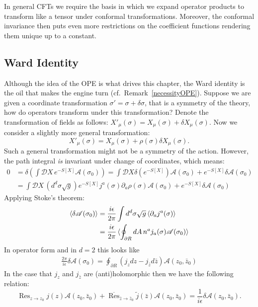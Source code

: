 \documentclass{report}
\theoremstyle{plain}
\theoremstyle{definition}
\theoremstyle{remark}
\newcommand{\FR}[2]{\frac{#1}{#2}}
\newcommand{\mc}{\mathcal}
\newcommand{\ms}{\mathscr}
\newcommand{\sg}{\sigma}
\newcommand{\di}{\partial}
\DeclareMathOperator{\Res}{Res}
\begin{document}
In general CFTs we require the basis in which we expand operator products
to transform like a tensor under conformal transformations. Moreover, the
conformal invariance then puts even more restrictions on the coefficient
functions rendering them unique up to a constant.

\subsection{Ward Identity}
Although the idea of the OPE is what drives this chapter, the Ward identity
is the oil that makes the engine turn (cf.~Remark~\ref{necessityOPE}). Suppose we
are given a coordinate transformation $\sg' = \sg+\delta\sg$, that is a
symmetry of the theory, how do operators transform under this
transformation? Denote the transformation of fields as follows:
$X'_\mu(\sg) = X_\mu(\sg) + \delta X_\mu(\sg)$. Now we consider a slightly
more general transformation:
\[ X'_\mu(\sg) = X_\mu(\sg)+\rho(\sg)\delta X_\mu(\sg).\]
Such a general transformation might not be a symmetry of the action.
However, the path integral \emph{is} invariant under change of coordinates,
which means:
\begin{align*}
0 &= \delta\left( \int \mc DX\, e^{-S[X]}\ms A(\sg_0) \right)
=\int\mc DX\delta (e^{-S[X]})\ms A(\sg_0)+e^{-S[X]}\delta\ms A(\sg_0)\\
&=\int\mc DX\,(d^d\sg\sqrt{g}) e^{-S[X]} j^a(\sg)\di_a\rho(\sg)\ms
A(\sg_0)+e^{-S[X]}\delta\ms A(\sg_0)
\end{align*}
Applying Stoke's theorem:
\begin{align*}
\braket{\delta \ms A(\sg_0)} &= \FR{i\epsilon}{2\pi} \int d^d\sg
\sqrt{g} \braket{\di_aj^a(\sg)}\\
&= \FR{i\epsilon}{2\pi} \braket{ \oint_{\di R} dA\,n^aj_a(\sg)\ms A(\sg_0)}
\end{align*}
In operator form and in $d=2$ this looks like
\begin{align}
    \FR{2\pi}{i\epsilon}\delta \ms A(\sg_0)
=\oint_{\di R} (j_zdz - j_{\bar z}d\bar z) \ms A(z_0,\bar z_0)
    \label{conformalWard}
\end{align}
In the case that $j_z$ and $j_{\bar z}$ are (anti)holomorphic then we have
the following relation:
\[\Res_{z\to z_0} j(z)\ms A(z_0,\bar z_0) + \overline{\Res}_{\bar z\to\bar
z_0} \tilde j(\bar z)\ms A(z_0,\bar z_0) = \FR{1}{i\epsilon}\delta\ms
A(z_0,\bar z_0).\]
\end{document}
